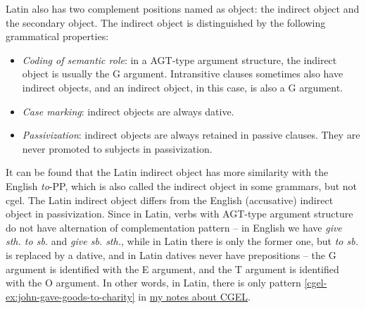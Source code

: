 \documentclass{article}
\newcommand*{\corpus}[1]{\emph{#1}}
\newcommand{\cgel}{\href{../English/cambridge.pdf}{my notes about CGEL}}
\begin{document}
Latin also has two complement positions named as object:
the indirect object and the secondary object.
The indirect object is distinguished by the following grammatical properties:
\begin{itemize}
    \item \emph{Coding of semantic role}: in a AGT-type argument structure, 
    the indirect object is usually the G argument.
    Intransitive clauses sometimes also have indirect objects, 
    and an indirect object, in this case, is also a G argument.
    \item \emph{Case marking}: indirect objects are always dative.
    \item \emph{Passivization}: indirect objects are always retained in passive clauses. 
    They are never promoted to subjects in passivization.
\end{itemize}
It can be found that the Latin indirect object has more similarity with the English \corpus{to}-PP,
which is also called the indirect object in some grammars, but not \ac{cgel}.
The Latin indirect object differs from the English (accusative) indirect object in passivization.
Since in Latin, verbs with AGT-type argument structure do not have alternation of complementation pattern
-- in English we have \corpus{give sth. to sb.} and \corpus{give sb. sth.}, 
while in Latin there is only the former one, but \corpus{to sb.} is replaced by a dative,
and in Latin datives never have prepositions --
the G argument is identified with the E argument,
and the T argument is identified with the O argument.
In other words, in Latin, there is only pattern \eqref{cgel-ex:john-gave-goods-to-charity} in \cgel.
\end{document}
